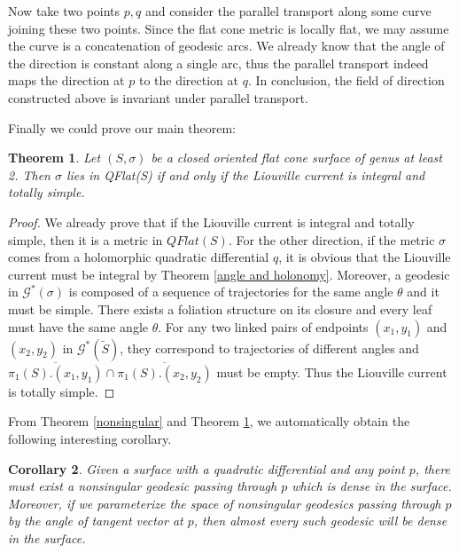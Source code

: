 \documentclass[reqno]{amsart}
\theoremstyle{plain}
\newtheorem{thm}{Theorem}[section]
\newtheorem{cor}[thm]{Corollary}
\theoremstyle{definition}
\theoremstyle{remark}
\theoremstyle{definition}
\newcommand{\?}{\textcolor{red}{?}}
\newcommand{\Gssigma}{\mathcal{G}^*(\sigma) }
\newcommand{\Gss}{\mathcal{G}^*(\tilde{S}) }
\begin{document}
Now take two points $p,q$ and consider the parallel transport along some curve joining these two points. Since the flat cone metric is locally flat, we may assume the curve is a concatenation of geodesic arcs. We already know that the angle of the direction is constant along a single arc, thus the parallel transport indeed maps the direction at $p$ to the direction at $q$. In conclusion, the field of direction constructed above is invariant under parallel transport.

Finally we could prove our main theorem:
\begin{thm}\label{main theorem}
Let $(S,\sigma)$ be a closed oriented flat cone surface of genus at least 2. Then $\sigma$ lies in QFlat(S) if and only if the Liouville current is integral and totally simple.
\end{thm}
\begin{proof}
We already prove that if the Liouville current is integral and totally simple, then it is a metric in $QFlat(S)$. For the other direction, if the metric $\sigma$ comes from a holomorphic quadratic differential $q$, it is obvious that the Liouville current must be integral by Theorem \ref{angle and holonomy}. Moreover, a geodesic in $\Gssigma$ is composed of a sequence of trajectories for the same angle $\theta$ and it must be simple. There exists a foliation structure on its closure and every leaf must have the same angle $\theta$. For any two linked pairs of endpoints $(x_1,y_1)$ and $(x_2,y_2)$ in $\Gss$, they correspond to trajectories of different angles and $\overline{\pi_1(S).(x_1,y_1) }\cap \overline{\pi_1(S).(x_2,y_2) }$ must be empty. Thus the Liouville current is totally simple.
\end{proof}

From Theorem \ref{nonsingular} and Theorem \ref{main theorem}, we automatically obtain the following interesting corollary.
\begin{cor}\label{main corollary}
    Given a surface with a quadratic differential and any point $p$, there must exist a nonsingular geodesic passing through $p$ which is dense in the surface. Moreover, if we parameterize the space of nonsingular geodesics passing through $p$ by the angle of tangent vector at $p$, then almost every such geodesic will be dense in the surface.
\end{cor}





\end{document}
